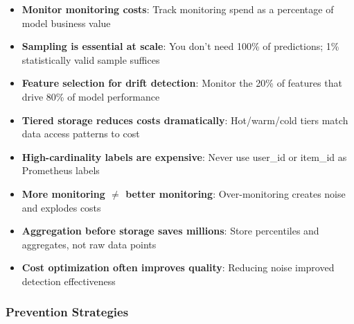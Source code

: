 \begin{itemize}
    \item \textbf{Monitor monitoring costs}: Track monitoring spend as a percentage of model business value
    \item \textbf{Sampling is essential at scale}: You don't need 100\% of predictions; 1\% statistically valid sample suffices
    \item \textbf{Feature selection for drift detection}: Monitor the 20\% of features that drive 80\% of model performance
    \item \textbf{Tiered storage reduces costs dramatically}: Hot/warm/cold tiers match data access patterns to cost
    \item \textbf{High-cardinality labels are expensive}: Never use user\_id or item\_id as Prometheus labels
    \item \textbf{More monitoring $\neq$ better monitoring}: Over-monitoring creates noise and explodes costs
    \item \textbf{Aggregation before storage saves millions}: Store percentiles and aggregates, not raw data points
    \item \textbf{Cost optimization often improves quality}: Reducing noise improved detection effectiveness
\end{itemize}

\subsubsection{Prevention Strategies}


